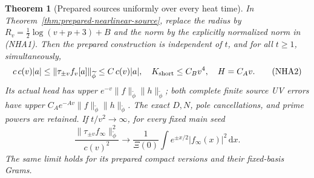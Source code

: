 \documentclass[11pt]{article}
\newtheorem{theorem}{Theorem}
\theoremstyle{remark}\newtheorem{remark}[theorem]{Remark}
\newcommand{\dd}{\,\mathrm d}
\begin{document}
\begin{theorem}[Prepared sources uniformly over every heat time]
\label{thm:all-heat-prepared}
In Theorem~\ref{thm:prepared-nearlinear-source}, replace the radius
by \(R_v=\frac12\log(v+p+3)+B\) and the norm by the explicitly
normalized norm in (NHA1). Then the prepared construction is
independent of \(t\), and for all \(t\ge1\), simultaneously,
\[
 c\,c(v)|a|\le\|\tau_{\pm v}f_v[a]\|_{\widetilde\phi}
       \le C\,c(v)|a|,\quad
 K_{\rm short}\le C_Bv^4,\quad H=C_Av.                        \tag{NHA2}
\]
Its actual head has upper
\(e^{-v}\|f\|_{\widetilde\phi}\|h\|_{\widetilde\phi}\);
both complete finite source UV errors have upper
\(C_Ae^{-Av}\|f\|_{\widetilde\phi}\|h\|_{\widetilde\phi}\).
The exact \(D,N\), pole cancellations, and prime powers are retained.
If \(t/v^2\to\infty\), for every fixed main seed
\[
 \frac{\|\tau_{\pm v}f_\infty\|_{\widetilde\phi}^2}{c(v)^2}
   \longrightarrow
       \frac1{\Xi(0)}\int e^{\pm x/2}|f_\infty(x)|^2\dd x .
                                                               \tag{NHA3}
\]
The same limit holds for its prepared compact versions and their
fixed-basis Grams.
\end{theorem}
\end{document}

